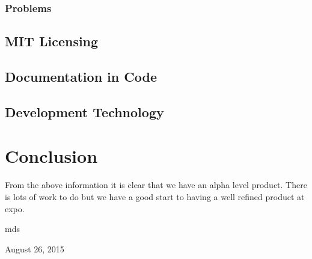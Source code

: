 \documentclass[10pt,draftclsnofoot,onecolumn]{IEEEtran}
\begin{document}
\subsubsection{Problems}


\subsection{MIT Licensing}


\subsection{Documentation in Code}


\subsection{Development Technology}


\section{Conclusion}
From the above information it is clear that we have an alpha level product. There is lots of work to do but we have a good start to having a well refined product at expo.



\hfill mds
 
\hfill August 26, 2015

%
%
\end{document}
